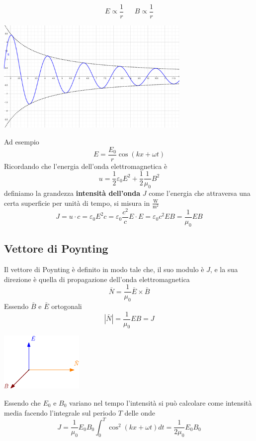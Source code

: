 \documentclass[10pt, letterpaper]{report}
\begin{document}
$$ E\propto \frac{1}{r} \ \ \ \ \ \ \  
B\propto \frac{1}{r}$$
\begin{center}
    \includegraphics[width=0.7\textwidth]{images/andamentoModuloOnda.pdf}
\end{center}
Ad esempio 
$$ E=\frac{E_0}{r}\cos(kx+\omega t)$$
Ricordando che l'energia dell'onda elettromagnetica è 
$$u=\frac{1}{2}\varepsilon_0E^2+\frac{1}{2}\frac{1}{\mu_0}B^2 $$
definiamo la grandezza \textbf{intensità dell'onda} $J$ come l'energia che attraversa una certa superficie per unità di tempo, si misura in $\frac{\text{W}}{\text{m}^2}$
$$ J=u\cdot c=\varepsilon_0E^2c=\varepsilon_0\frac{c^2}{c}E\cdot E=\varepsilon_0c^2EB=\frac{1}{\mu_0}EB$$
\subsection{Vettore di Poynting}
Il vettore di Poynting è definito in modo tale che, il suo modulo è $J$, e la sua direzione è quella di propagazione dell'onda elettromagnetica 
$$\bar N = \frac{1}{\mu_0}\bar E \times \bar B $$
Essendo $\bar B $ e $\bar E$ ortogonali 
$$ |\bar N|=\frac{1}{\mu_0} E   B=J$$
\begin{center}
    \includegraphics[width=0.3\textwidth]{images/Poynting.eps}
\end{center}
Essendo che $E_0$ e $B_0$ variano nel tempo l'intensità si può calcolare come intensità media facendo l'integrale sul periodo $T$ delle onde 
$$ J=\frac{1}{\mu_0}E_0B_0\int_0^T\cos^2(kx+\omega t)dt=\frac{1}{2\mu_0}E_0B_0$$


\end{document}
